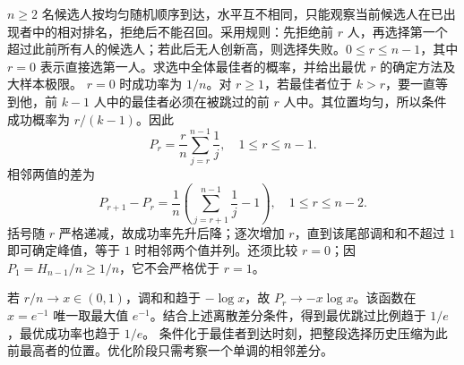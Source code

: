 $n\ge2$ 名候选人按均匀随机顺序到达，水平互不相同，只能观察当前候选人在已出现者中的相对排名，拒绝后不能召回。采用规则：先拒绝前 $r$ 人，再选择第一个超过此前所有人的候选人；若此后无人创新高，则选择失败。$0\le r\le n-1$，其中 $r=0$ 表示直接选第一人。求选中全体最佳者的概率，并给出最优 $r$ 的确定方法及大样本极限。
\solution $r=0$ 时成功率为 $1/n$。对 $r\ge1$，若最佳者位于 $k>r$，要一直等到他，前 $k-1$ 人中的最佳者必须在被跳过的前 $r$ 人中。其位置均匀，所以条件成功概率为 $r/(k-1)$。因此
\[
\boxed{P_r=\frac rn\sum_{j=r}^{n-1}\frac1j,\quad1\le r\le n-1.}
\]
相邻两值的差为
\[
P_{r+1}-P_r=\frac1n\left(\sum_{j=r+1}^{n-1}\frac1j-1\right),
\quad1\le r\le n-2.
\]
括号随 $r$ 严格递减，故成功率先升后降；逐次增加 $r$，直到该尾部调和和不超过 $1$ 即可确定峰值，等于 $1$ 时相邻两个值并列。还须比较 $r=0$；因 $P_1=H_{n-1}/n\ge1/n$，它不会严格优于 $r=1$。

若 $r/n\to x\in(0,1)$，调和和趋于 $-\log x$，故 $P_r\to-x\log x$。该函数在 $x=e^{-1}$ 唯一取最大值 $e^{-1}$。结合上述离散差分条件，得到最优跳过比例趋于 $1/e$，最优成功率也趋于 $1/e$。
\insight 条件化于最佳者到达时刻，把整段选择历史压缩为此前最高者的位置。优化阶段只需考察一个单调的相邻差分。
